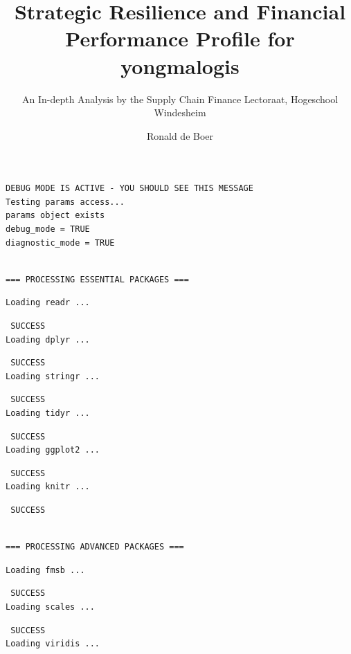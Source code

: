 \documentclass[
  oneside,
  open=any,
  fontsize=11pt]{article}
\title{Strategic Resilience and Financial Performance Profile for
yongmalogis}
\subtitle{An In-depth Analysis by the Supply Chain Finance Lectoraat,
Hogeschool Windesheim}
\author{Ronald de Boer}
\date{}
\begin{document}
\maketitle


\begin{verbatim}
DEBUG MODE IS ACTIVE - YOU SHOULD SEE THIS MESSAGE
Testing params access...
params object exists
debug_mode = TRUE 
diagnostic_mode = TRUE 
\end{verbatim}

\begin{verbatim}

=== PROCESSING ESSENTIAL PACKAGES ===
\end{verbatim}

\begin{verbatim}
Loading readr ...
\end{verbatim}

\begin{verbatim}
 SUCCESS
Loading dplyr ...
\end{verbatim}

\begin{verbatim}
 SUCCESS
Loading stringr ...
\end{verbatim}

\begin{verbatim}
 SUCCESS
Loading tidyr ...
\end{verbatim}

\begin{verbatim}
 SUCCESS
Loading ggplot2 ...
\end{verbatim}

\begin{verbatim}
 SUCCESS
Loading knitr ...
\end{verbatim}

\begin{verbatim}
 SUCCESS
\end{verbatim}

\begin{verbatim}

=== PROCESSING ADVANCED PACKAGES ===
\end{verbatim}

\begin{verbatim}
Loading fmsb ...
\end{verbatim}

\begin{verbatim}
 SUCCESS
Loading scales ...
\end{verbatim}

\begin{verbatim}
 SUCCESS
Loading viridis ...
\end{verbatim}
\end{document}
